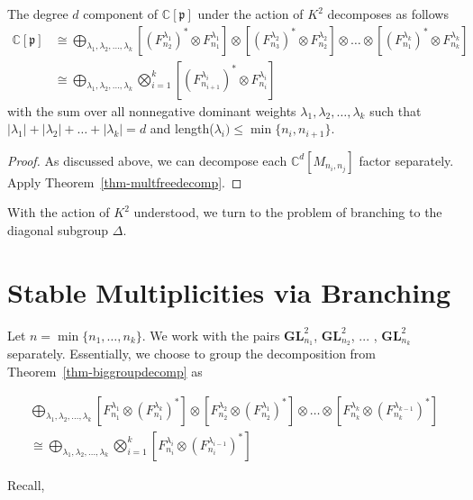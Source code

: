 \documentclass[ALCO,Unicode]{cedram}
\newcommand{\C}{\mathbb{C}}
\newcommand{\p}{\mathfrak{p}}
\newcommand{\GL}{\textbf{GL}}
\begin{document}
    \begin{thm} \label{thm-biggroupdecomp}
        The degree $d$ component of $\C[\p]$ under the action of $K^2$ decomposes as follows 
        \begin{align*}
        \C[\p] &\cong \bigoplus_{\lambda_1, \lambda_2, \dots , \lambda_k} [(F_{n_2}^{\lambda_1})^*\otimes F_{n_1}^{\lambda_1}] \otimes [(F_{n_3}^{\lambda_2})^*\otimes F_{n_2}^{\lambda_2}] \otimes \dots \otimes [(F_{n_1}^{\lambda_k})^*\otimes F_{n_k}^{\lambda_k}]\\
        &\cong \bigoplus_{\lambda_1, \lambda_2, \dots , \lambda_k} \bigotimes_{i=1}^k [(F_{n_{i+1}}^{\lambda_i})^* \otimes F_{n_i}^{\lambda_i}]
        \end{align*}
        with the sum over all nonnegative dominant weights $\lambda_1, \lambda_2, \dots ,\lambda_k$ such that $|\lambda_1| + |\lambda_2| + \dots + |\lambda_k| = d$ and length($\lambda_i) \leq \min\{n_i,n_{i+1}\}$.
    \end{thm}

    \begin{proof}
        As discussed above, we can decompose each $\C^d[M_{n_i,n_j}]$ factor separately. Apply Theorem~\ref{thm-multfreedecomp}.
    \end{proof}


With the action of $K^2$ understood, we turn to the problem of branching to the diagonal subgroup $\Delta$. 


\section{Stable Multiplicities via Branching}


Let $n = \min \{n_1, \dots , n_k\}$. We work with the pairs $\GL_{n_1}^2$, $\GL_{n_2}^2$, ... , $\GL_{n_k}^2$ separately. Essentially, we choose to group the decomposition from Theorem~\ref{thm-biggroupdecomp} as

\begin{gather*}
\bigoplus_{\lambda_1, \lambda_2, \dots , \lambda_k} [F_{n_1}^{\lambda_1}\otimes (F_{n_1}^{\lambda_k})^*] \otimes [F_{n_2}^{\lambda_2}\otimes (F_{n_2}^{\lambda_1})^*] \otimes \dots \otimes [F_{n_k}^{\lambda_k}\otimes (F_{n_k}^{\lambda_{k-1}})^*] \\
\cong \bigoplus_{\lambda_1, \lambda_2, \dots , \lambda_k} \bigotimes_{i=1}^k [F_{n_i}^{\lambda_i}\otimes (F_{n_i}^{\lambda_{i-1}})^*]
\end{gather*}

Recall,
\end{document}
